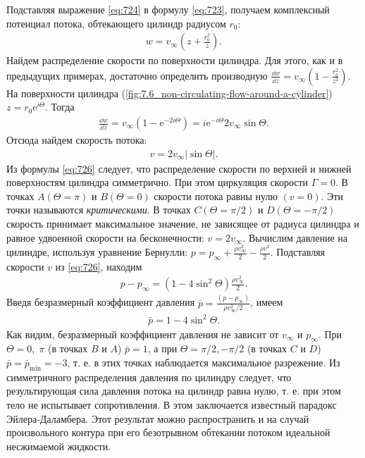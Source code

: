 	Подставляя выражение \eqref{eq:724} в формулу \eqref{eq:723}, получаем комплексный потенциал потока, обтекающего цилиндр радиусом $r_0$:
	\begin{gather}
		w = v_\infty\left(z + \frac{r_0^2}{z}\right).\label{eq:725}
	\end{gather}\n
	Найдем распределение скорости по поверхности цилиндра. Для этого, как и в предыдущих примерах, достаточно определить производную $\frac{\dd w}{\dd z} = v_\infty\left(1 - \frac{r_0^2}{z^2}\right)$.\n
	На поверхности цилиндра (\cref{fig:7.6_non-circulating-flow-around-a-cylinder}) $z = r_0\mathrm{e}^{i\varTheta}$. Тогда
	\begin{gather*}
		\frac{\dd w}{\dd z} = v_\infty\left(1 - \mathrm{e}^{-2i\varTheta}\right) = i\mathrm{e}^{-i\varTheta}2v_\infty\sin\varTheta.
	\end{gather*}\n
	Отсюда найдем скорость потока:
	\begin{gather}
		v = 2v_\infty\left|\sin\varTheta\right|.\label{eq:726}
	\end{gather}\n
	Из формулы \eqref{eq:726} следует, что распределение скорости по верхней и нижней поверхностям цилиндра симметрично. При этом циркуляция скорости $\Gamma = 0$. В точках $A\left(\varTheta = \pi\right)$ и $B\left(\varTheta = 0\right)$ скорости потока равны нулю $\left(v = 0\right)$. Эти точки называются \textit{критическими}. В точках $C\left(\varTheta = \pi/2\right)$ и $D\left(\varTheta = -\pi/2\right)$ скорость принимает максимальное значение, не зависящее от радиуса цилиндра и равное удвоенной скорости на бесконечности: $v = 2v_\infty$.\n
	Вычислим давление на цилиндре, используя уравнение Бернулли: $p = p_\infty + \frac{\rho v_\infty^2}{2} - \frac{\rho v^2}{2}$. Подставляя скорости $v$ из \eqref{eq:726}, находим
	\begin{gather*}
		p - p_\infty = \left(1 - 4\sin^2\varTheta\right)\frac{\rho v_\infty^2}{2}.
	\end{gather*}\n
	Введя безразмерный коэффициент давления $\bar{p} = \frac{\left(p - p_\infty\right)}{\rho v_\infty^2/2}$, имеем
	\begin{gather}
		\bar{p} = 1 - 4\sin^2\varTheta.\label{eq:727}
	\end{gather}\n
	Как видим, безразмерный коэффициент давления не зависит от $v_\infty$ и $p_\infty$. При $\varTheta = 0,\; \pi$ (в точках $B$ и $A$) $\bar{p} = 1$, а при $\varTheta = \pi/2, -\pi/2$ (в точках $C$ и $D$) $\bar{p} = \bar{p}_\mathrm{min} = -3$, т. е. в этих точках наблюдается максимальное разрежение.\n
	Из симметричного распределения давления по цилиндру следует, что результирующая сила давления потока на цилиндр равна нулю, т. е. при этом тело не испытывает сопротивления. В этом заключается известный парадокс Эйлера-Даламбера. Этот результат можно распространить и на случай произвольного контура при его безотрывном обтекании потоком идеальной несжимаемой жидкости.\n
